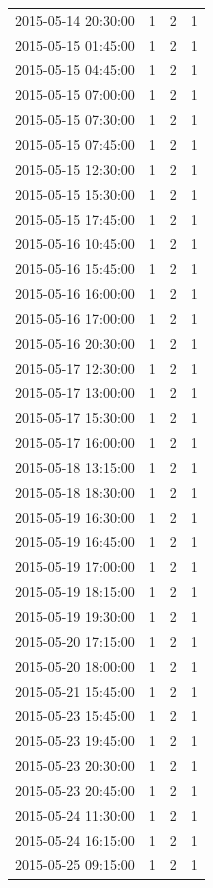 \begin{tabular}{lrrr}
2015-05-14 20:30:00 & 1 & 2 & 1 \\
2015-05-15 01:45:00 & 1 & 2 & 1 \\
2015-05-15 04:45:00 & 1 & 2 & 1 \\
2015-05-15 07:00:00 & 1 & 2 & 1 \\
2015-05-15 07:30:00 & 1 & 2 & 1 \\
2015-05-15 07:45:00 & 1 & 2 & 1 \\
2015-05-15 12:30:00 & 1 & 2 & 1 \\
2015-05-15 15:30:00 & 1 & 2 & 1 \\
2015-05-15 17:45:00 & 1 & 2 & 1 \\
2015-05-16 10:45:00 & 1 & 2 & 1 \\
2015-05-16 15:45:00 & 1 & 2 & 1 \\
2015-05-16 16:00:00 & 1 & 2 & 1 \\
2015-05-16 17:00:00 & 1 & 2 & 1 \\
2015-05-16 20:30:00 & 1 & 2 & 1 \\
2015-05-17 12:30:00 & 1 & 2 & 1 \\
2015-05-17 13:00:00 & 1 & 2 & 1 \\
2015-05-17 15:30:00 & 1 & 2 & 1 \\
2015-05-17 16:00:00 & 1 & 2 & 1 \\
2015-05-18 13:15:00 & 1 & 2 & 1 \\
2015-05-18 18:30:00 & 1 & 2 & 1 \\
2015-05-19 16:30:00 & 1 & 2 & 1 \\
2015-05-19 16:45:00 & 1 & 2 & 1 \\
2015-05-19 17:00:00 & 1 & 2 & 1 \\
2015-05-19 18:15:00 & 1 & 2 & 1 \\
2015-05-19 19:30:00 & 1 & 2 & 1 \\
2015-05-20 17:15:00 & 1 & 2 & 1 \\
2015-05-20 18:00:00 & 1 & 2 & 1 \\
2015-05-21 15:45:00 & 1 & 2 & 1 \\
2015-05-23 15:45:00 & 1 & 2 & 1 \\
2015-05-23 19:45:00 & 1 & 2 & 1 \\
2015-05-23 20:30:00 & 1 & 2 & 1 \\
2015-05-23 20:45:00 & 1 & 2 & 1 \\
2015-05-24 11:30:00 & 1 & 2 & 1 \\
2015-05-24 16:15:00 & 1 & 2 & 1 \\
2015-05-25 09:15:00 & 1 & 2 & 1 \\

\end{tabular}
